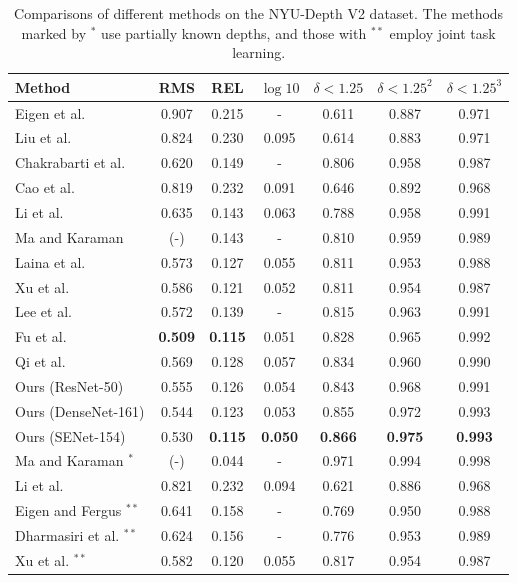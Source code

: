 \documentclass[10pt,twocolumn,letterpaper]{article}
\begin{document}
\setlength{\tabcolsep}{3.2pt}
\begin{table*}[!t]
\begin{center}
\caption{Comparisons of different methods on the NYU-Depth V2 dataset. The methods marked by $^*$ use partially known depths, and those with $^{**}$ employ joint task learning.}
\label{nyu_depth}
\begin{tabular}{|l|c|c|c|c|c|c|}
\hline
Method & RMS & REL &$\log10$& $\delta<1.25$ & $\delta<1.25^{2}$ & $\delta<1.25^{3}$\\
\hline\hline
Eigen et al. \protect\cite{Eigen2014depth} &0.907  &0.215 &- &0.611 &0.887 &0.971\\   
Liu et al. \protect\cite{liu2015deep} &0.824  &0.230 &0.095 &0.614 &0.883 &0.971   \\ 
Chakrabarti et al. \protect\cite{chakrabarti2016depth} &0.620  &0.149 &- &0.806 &0.958 &0.987\\ 
Cao et al. \protect\cite{cao2017estimating} &0.819  &0.232 &0.091 &0.646 &0.892 &0.968\\
Li et al. \protect\cite{li2017two}  &0.635 &0.143 &0.063 &0.788 &0.958 &0.991 \\
Ma and Karaman  \protect\cite{ma2017sparse} 	&(-)  &0.143 &- &0.810 &0.959 &0.989	 \\    
Laina et al. \protect\cite{laina2016deeper} &0.573 &0.127 &0.055 &0.811 &0.953 &0.988 \\ 
Xu et al. \protect\cite{Xu2017MultiscaleCC} &0.586  &0.121 &0.052 &0.811 &0.954 &0.987	\\  
Lee et al. \protect\cite{lee2018single} &0.572  &0.139 &- &0.815 &0.963 &0.991	 \\    
Fu et al. \protect\cite{fu2018deep} 	&\textbf{0.509}  &\textbf{0.115} &0.051 &0.828 &0.965 &0.992	 \\    
Qi et al. \protect\cite{qi2018geonet} &0.569  &0.128 &0.057 &0.834 &0.960 &0.990	 \\  
\hline
Ours (ResNet-50) &0.555 &0.126&0.054 &0.843 &0.968 &0.991\\ 
Ours (DenseNet-161) &0.544 &0.123 &0.053 &0.855 &0.972 &0.993\\ 
Ours (SENet-154) &0.530 &\textbf{0.115}  &\textbf{0.050} &\textbf{0.866} &\textbf{0.975} &\textbf{0.993}\\\hline
Ma and Karaman \protect\cite{ma2017sparse}$^{*}$ 	&(-)   &0.044&- &0.971 &0.994 &0.998	 \\  
Li et al. \protect\cite{Li2015DepthAS} &0.821  &0.232 &0.094 &0.621 &0.886 &0.968  \\ 
Eigen and Fergus \protect\cite{Eigen2015PredictingDS}$^{**}$ & 0.641  &0.158&- & 0.769 & 0.950 & 0.988	\\ 
Dharmasiri et al. \protect\cite{Dharmasiri2017JointPO}$^{**}$	&0.624  &0.156&- &0.776 &0.953 &0.989	\\  
Xu et al. \protect\cite{xu2018pad}$^{**}$	&0.582  &0.120&0.055 &0.817 &0.954 &0.987	\\  
\hline
\end{tabular}
\end{center}
\end{table*}
\setlength{\tabcolsep}{1.4pt}
\end{document}
